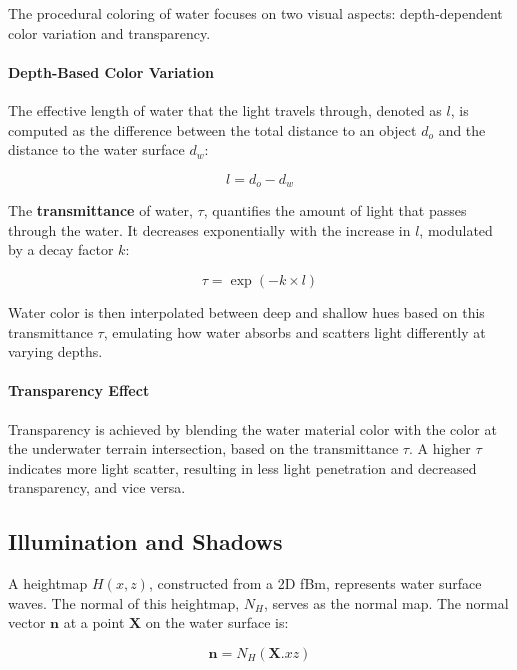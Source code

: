 The procedural coloring of water focuses on two visual aspects: depth-dependent color variation and transparency. 

\paragraph{Depth-Based Color Variation}
   
The effective length of water that the light travels through, denoted as $l$, is computed as the difference between the total distance to an object $d_{o}$ and the distance to the water surface $d_{w}$:

\begin{equation}
   l = d_{o}-d_w
\end{equation}

The \textbf{transmittance} of water, $\tau$, quantifies the amount of light that passes through the water. It decreases exponentially with the increase in $l$, modulated by a decay factor $k$:

\begin{equation}
    \tau = \exp(-k \times l)
\end{equation}
   
Water color is then interpolated between deep and shallow hues based on this transmittance $\tau$, emulating how water absorbs and scatters light differently at varying depths.

\paragraph{Transparency Effect}

Transparency is achieved by blending the water material color with the color at the underwater terrain intersection, based on the transmittance $\tau$. A higher $\tau$ indicates more light scatter, resulting in less light penetration and decreased transparency, and vice versa.

\subsection{Illumination and Shadows}
\label{Water Shading}

A heightmap $H(x,z)$, constructed from a 2D fBm, represents water surface waves. The normal of this heightmap, $N_H$, serves as the normal map. The normal vector $\mathbf{n}$ at a point $\mathbf{X}$ on the water surface is:

\begin{equation}
\mathbf{n}= N_{H}(\mathbf{X}.xz)
\end{equation}

